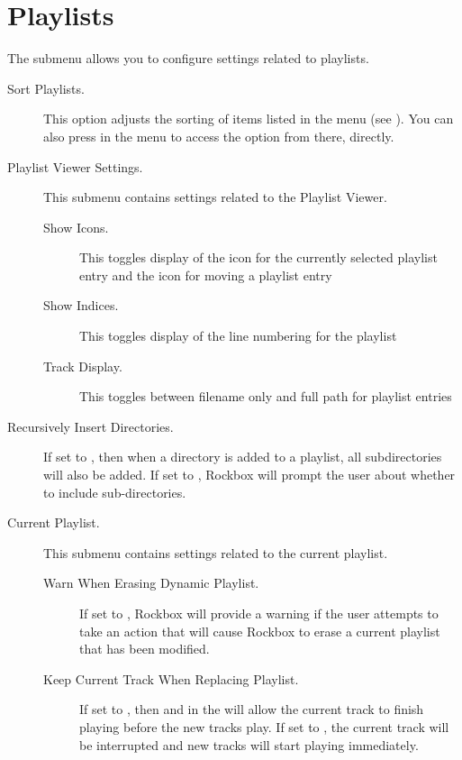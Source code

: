 \section{\label{ref:PlaylistOptions}Playlists}

The  submenu allows you to configure settings
related to playlists.


\begin{description}

\item[Sort Playlists.]
   This option adjusts the sorting of items listed in the 
   menu (see ). You can also press
   \ActionStdContext{} in the  menu to access the option
   from there, directly.

\item[Playlist Viewer Settings.]
   This submenu contains settings related to the Playlist Viewer.
   \begin{description}
    \item[Show Icons.] This toggles display of the icon for the currently
    selected playlist entry and the icon for moving a playlist entry
    \item[Show Indices.] This toggles display of the line numbering for
       the playlist
    \item[Track Display.] This toggles between filename only and full path
       for playlist entries
  \end{description}

\item[Recursively Insert Directories.]
  If set to , then when a directory is added to a playlist,
  all subdirectories will also be added. If set to ,
  Rockbox will prompt the user about whether to include sub-directories.

\item[Current Playlist.]
  This submenu contains settings related to the current playlist.
  \begin{description}

  \item[Warn When Erasing Dynamic Playlist.]
  If set to , Rockbox will provide a warning if the user attempts to
  take an action that will cause Rockbox to erase a current playlist that has been
  modified.

  \item[Keep Current Track When Replacing Playlist.]
  If set to , then  and  in
  the  will allow the current track to finish
  playing before the new tracks play. If set to , the current
  track will be interrupted and new tracks will start playing immediately.


\end{description}
\end{description}
